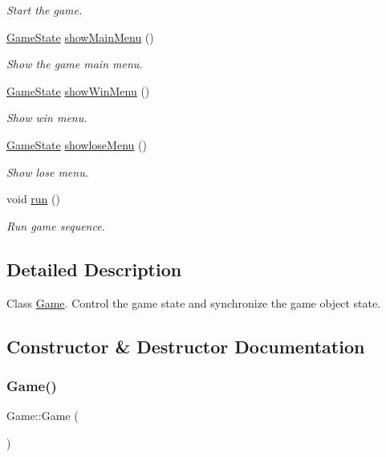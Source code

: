 \begin{DoxyCompactItemize}
\begin{DoxyCompactList}\small\item\em Start the game. \end{DoxyCompactList}\item 
\mbox{\hyperlink{_constants_8hpp_a7899b65f1ea0f655e4bbf8d2a5714285}{Game\+State}} \mbox{\hyperlink{class_game_a1bbeccf533a8d660ef5858c1f0cd08b6}{show\+Main\+Menu}} ()
\begin{DoxyCompactList}\small\item\em Show the game main menu. \end{DoxyCompactList}\item 
\mbox{\hyperlink{_constants_8hpp_a7899b65f1ea0f655e4bbf8d2a5714285}{Game\+State}} \mbox{\hyperlink{class_game_a02d7239b140618836f409b6926070f88}{show\+Win\+Menu}} ()
\begin{DoxyCompactList}\small\item\em Show win menu. \end{DoxyCompactList}\item 
\mbox{\hyperlink{_constants_8hpp_a7899b65f1ea0f655e4bbf8d2a5714285}{Game\+State}} \mbox{\hyperlink{class_game_a6b065cbc7a8a804ce90b5e5463b8ebfd}{showlose\+Menu}} ()
\begin{DoxyCompactList}\small\item\em Show lose menu. \end{DoxyCompactList}\item 
void \mbox{\hyperlink{class_game_a1ab78f5ed0d5ea879157357cf2fb2afa}{run}} ()
\begin{DoxyCompactList}\small\item\em Run game sequence. \end{DoxyCompactList}\end{DoxyCompactItemize}


\subsection{Detailed Description}
Class \mbox{\hyperlink{class_game}{Game}}. Control the game state and synchronize the game object state. 

\subsection{Constructor \& Destructor Documentation}
\mbox{\label{class_game_ad59df6562a58a614fda24622d3715b65}} 
\subsubsection{\texorpdfstring{Game()}{Game()}}
{\footnotesize\ttfamily Game\+::\+Game (\begin{DoxyParamCaption}{ }\end{DoxyParamCaption})}



